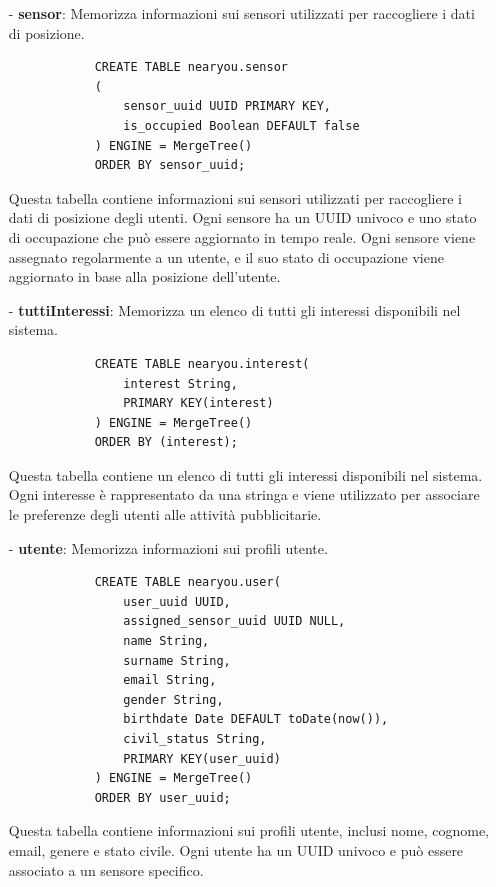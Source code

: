\documentclass[10pt]{article}
\begin{document}
\begin{itemize}
            \item[-] \textbf{sensor}: Memorizza informazioni sui sensori utilizzati per raccogliere i dati di posizione.
            \begin{lstlisting}
            CREATE TABLE nearyou.sensor
            (
                sensor_uuid UUID PRIMARY KEY,
                is_occupied Boolean DEFAULT false
            ) ENGINE = MergeTree()
            ORDER BY sensor_uuid;
            \end{lstlisting}
            Questa tabella contiene informazioni sui sensori utilizzati per raccogliere i dati di posizione degli utenti. Ogni sensore ha un UUID univoco e uno stato di occupazione che può essere aggiornato in tempo reale.
            Ogni sensore viene assegnato regolarmente a un utente, e il suo stato di occupazione viene aggiornato in base alla posizione dell'utente.

            \item[-] \textbf{tuttiInteressi}: Memorizza un elenco di tutti gli interessi disponibili nel sistema.
            \begin{lstlisting}
            CREATE TABLE nearyou.interest(
                interest String,
                PRIMARY KEY(interest)
            ) ENGINE = MergeTree()
            ORDER BY (interest);
            \end{lstlisting}
            Questa tabella contiene un elenco di tutti gli interessi disponibili nel sistema. Ogni interesse è rappresentato da una stringa e viene utilizzato per associare le preferenze degli utenti alle attività pubblicitarie.

            \item[-] \textbf{utente}: Memorizza informazioni sui profili utente.
            \begin{lstlisting}
            CREATE TABLE nearyou.user(
                user_uuid UUID,
                assigned_sensor_uuid UUID NULL,
                name String,
                surname String,
                email String,
                gender String,
                birthdate Date DEFAULT toDate(now()),
                civil_status String,
                PRIMARY KEY(user_uuid)
            ) ENGINE = MergeTree()
            ORDER BY user_uuid;
            \end{lstlisting}
            Questa tabella contiene informazioni sui profili utente, inclusi nome, cognome, email, genere e stato civile. Ogni utente ha un UUID univoco e può essere associato a un sensore specifico.

        \end{itemize}
\end{document}
